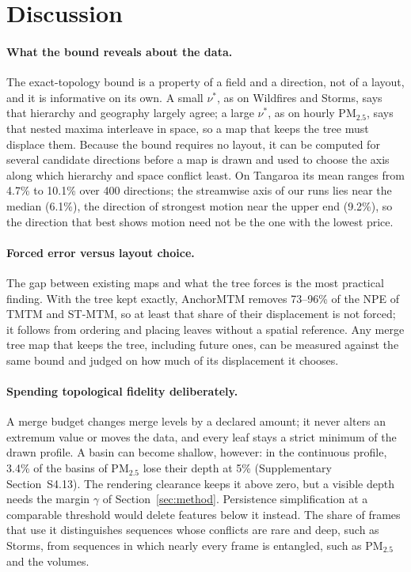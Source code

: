 \section{Discussion}\label{sec:discussion}
\paragraph{What the bound reveals about the data.} The exact-topology bound is a property of a field and a direction, not of a layout, and it is informative on its own. A small $\nu^*$, as on Wildfires and Storms, says that hierarchy and geography largely agree; a large $\nu^*$, as on hourly PM$_{2.5}$, says that nested maxima interleave in space, so a map that keeps the tree must displace them. Because the bound requires no layout, it can be computed for several candidate directions before a map is drawn and used to choose the axis along which hierarchy and space conflict least. On Tangaroa its mean ranges from 4.7\% to 10.1\% over 400 directions; the streamwise axis of our runs lies near the median (6.1\%), the direction of strongest motion near the upper end (9.2\%), so the direction that best shows motion need not be the one with the lowest price.

\paragraph{Forced error versus layout choice.} The gap between existing maps and what the tree forces is the most practical finding. With the tree kept exactly, AnchorMTM removes 73--96\% of the NPE of TMTM and ST-MTM, so at least that share of their displacement is not forced; it follows from ordering and placing leaves without a spatial reference. Any merge tree map that keeps the tree, including future ones, can be measured against the same bound and judged on how much of its displacement it chooses.

\paragraph{Spending topological fidelity deliberately.} A merge budget changes merge levels by a declared amount; it never alters an extremum value or moves the data, and every leaf stays a strict minimum of the drawn profile. A basin can become shallow, however: in the continuous profile, 3.4\% of the basins of PM$_{2.5}$ lose their depth at 5\% (Supplementary Section~S4.13). The rendering clearance keeps it above zero, but a visible depth needs the margin $\gamma$ of Section~\ref{sec:method}. Persistence simplification at a comparable threshold would delete features below it instead. The share of frames that use it distinguishes sequences whose conflicts are rare and deep, such as Storms, from sequences in which nearly every frame is entangled, such as PM$_{2.5}$ and the volumes.

